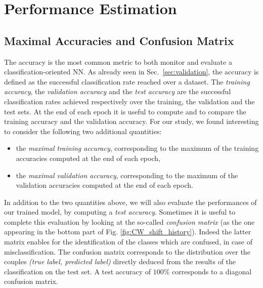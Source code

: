 \section{Performance Estimation}\label{sec:performances_NN}
\subsection{Maximal Accuracies and Confusion Matrix} 
The accuracy is the most common metric to both monitor and evaluate a classification-oriented NN. As already seen in Sec.~\ref{sec:validation}, the accuracy is defined as the successful classification rate reached over a dataset. The {\em training accuracy}, the \emph{validation accuracy} and the \emph{test accuracy} are the successful classification rates achieved respectively over the training, the validation and the test sets. At the end of each epoch it is useful to compute and to compare the training accuracy and the validation accuracy. For our study, we found interesting to consider the following two additional quantities: 
\begin{itemize}
\item the \emph{maximal training accuracy}, corresponding to the maximum of the training accuracies computed at the end of each epoch,
\item the \emph{maximal validation accuracy}, corresponding to the maximum of the validation accuracies computed at the end of each epoch.
\end{itemize}
In addition to the two quantities above, we will also evaluate the performances of our trained model, by computing a \emph{test accuracy}. Sometimes it is useful to complete this evaluation by looking at the so-called \emph{confusion matrix} (as the one appearing in the bottom part of Fig. \ref{fig:CW_shift_history}). Indeed the latter matrix enables for the identification of the classes which are confused, in case of misclassification. The confusion matrix corresponds to the distribution over the couples \emph{(true label, predicted label)} directly deduced from the results of the classification on the test set. A test accuracy of $100\%$ corresponds to a diagonal confusion matrix.\\


